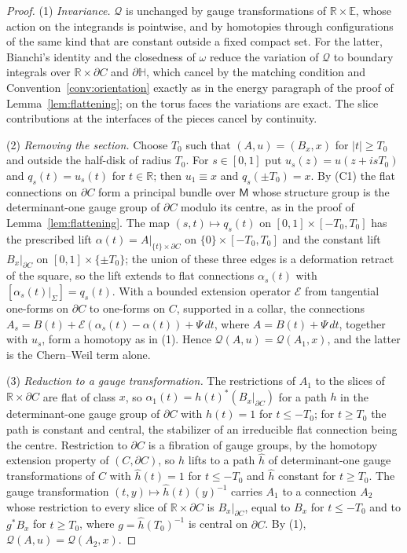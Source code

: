 \documentclass[11pt]{amsart}
\theoremstyle{definition}
\theoremstyle{remark}
\theoremstyle{plain}
\numberwithin{equation}{section}
\newcommand{\RR}{\mathbb{R}}
\newcommand{\Hb}{\mathbb{H}}
\newcommand{\Msf}{\mathsf{M}}
\begin{document}
\begin{proof}
(1) \emph{Invariance.} $\mathcal Q$ is unchanged by gauge transformations of
$\RR\times\mathbb E$, whose action on the integrands is pointwise, and by homotopies through
configurations of the same kind that are constant outside a fixed compact set. For the
latter, Bianchi's identity and the closedness of $\omega$ reduce the variation of $\mathcal Q$
to boundary integrals over $\RR\times\partial C$ and $\partial\Hb$, which cancel by the
matching condition and Convention~\ref{conv:orientation} exactly as in the energy paragraph of
the proof of Lemma~\ref{lem:flattening}; on the torus faces the variations are exact. The slice
contributions at the interfaces of the pieces cancel by continuity.

(2) \emph{Removing the section.} Choose $T_0$ such that $(A,u)=(B_x,x)$ for $|t|\ge T_0$ and
outside the half-disk of radius $T_0$. For $s\in[0,1]$ put $u_s(z)=u(z+isT_0)$ and
$q_s(t)=u_s(t)$ for $t\in\RR$; then $u_1\equiv x$ and $q_s(\pm T_0)=x$. By (C1) the flat
connections on $\partial C$ form a principal bundle over $\Msf$ whose structure group is the
determinant-one gauge group of $\partial C$ modulo its centre, as in the proof of
Lemma~\ref{lem:flattening}. The map $(s,t)\mapsto q_s(t)$ on $[0,1]\times[-T_0,T_0]$ has the
prescribed lift $\alpha(t)=A|_{\{t\}\times\partial C}$ on $\{0\}\times[-T_0,T_0]$ and the
constant lift $B_x|_{\partial C}$ on $[0,1]\times\{\pm T_0\}$; the union of these three edges
is a deformation retract of the square, so the lift extends to flat connections $\alpha_s(t)$
with $[\alpha_s(t)|_\Sigma]=q_s(t)$. With a bounded extension operator $\mathcal E$ from
tangential one-forms on $\partial C$ to one-forms on $C$, supported in a collar, the
connections $A_s=B(t)+\mathcal E(\alpha_s(t)-\alpha(t))+\Psi\,dt$, where $A=B(t)+\Psi\,dt$,
together with $u_s$, form a homotopy as in (1). Hence $\mathcal Q(A,u)=\mathcal Q(A_1,x)$, and
the latter is the Chern--Weil term alone.

(3) \emph{Reduction to a gauge transformation.} The restrictions of $A_1$ to the slices of
$\RR\times\partial C$ are flat of class $x$, so $\alpha_1(t)=h(t)^*(B_x|_{\partial C})$ for a
path $h$ in the determinant-one gauge group of $\partial C$ with $h(t)=1$ for $t\le-T_0$; for
$t\ge T_0$ the path is constant and central, the stabilizer of an irreducible flat connection
being the centre. Restriction to $\partial C$ is a fibration of gauge groups, by the homotopy
extension property of $(C,\partial C)$, so $h$ lifts to a path $\hat h$ of determinant-one gauge
transformations of $C$ with $\hat h(t)=1$ for $t\le-T_0$ and $\hat h$ constant for $t\ge T_0$.
The gauge transformation $(t,y)\mapsto\hat h(t)(y)^{-1}$ carries $A_1$ to a connection $A_2$
whose restriction to every slice of $\RR\times\partial C$ is $B_x|_{\partial C}$, equal to $B_x$
for $t\le-T_0$ and to $g^*B_x$ for $t\ge T_0$, where $g=\hat h(T_0)^{-1}$ is central on
$\partial C$. By (1), $\mathcal Q(A,u)=\mathcal Q(A_2,x)$.


\end{proof}
\end{document}
